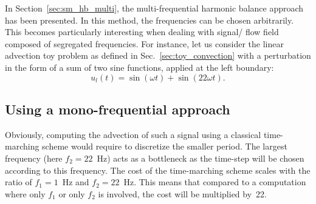 
In Section~\ref{sec:sm_hb_multi}, the multi-frequential harmonic
balance approach has been presented. In this method,
the frequencies can be chosen arbitrarily. This becomes particularly
interesting when dealing with signal/ flow field composed of segregated
frequencies. For instance, let us consider the linear advection toy problem
as defined in Sec.~\ref{sec:toy_convection} with 
a perturbation 
in the form of a sum of two sine functions,
applied at the left boundary:
\begin{equation}
    u_l(t) = \sin(\omega t) + \sin(22 \omega t).
    \label{eq:multifreq_inj_func}
\end{equation}

\subsection{Using a mono-frequential approach}

Obviously, computing the advection of such a signal using
a classical time-marching scheme would require to discretize the
smaller period. The largest frequency
(here $f_2 = 22$~Hz) acts as a bottleneck as the time-step will be chosen
according to this frequency. The cost of the time-marching
scheme scales with the ratio of $f_1= 1 $~Hz and $f_2=22$~Hz. This
means that compared to a computation where only $f_1$ or only $f_2$
is involved, the cost will be multiplied by~22.

